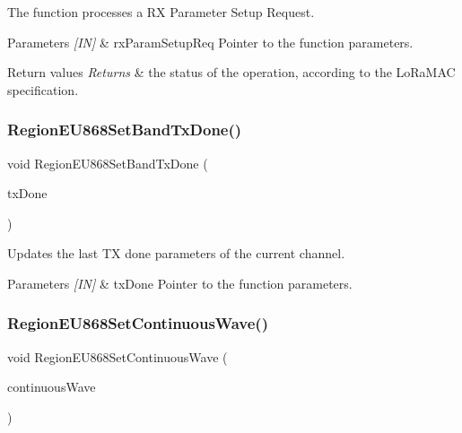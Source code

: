 The function processes a RX Parameter Setup Request. 


\begin{DoxyParams}{Parameters}
{\em \mbox{[}\+I\+N\mbox{]}} & rx\+Param\+Setup\+Req Pointer to the function parameters.\\
\hline
\end{DoxyParams}

\begin{DoxyRetVals}{Return values}
{\em Returns} & the status of the operation, according to the Lo\+Ra\+M\+AC specification. \\
\hline
\end{DoxyRetVals}
\mbox{\label{group__REGIONEU868_ga5cf25bd6be48790f3f637d60a236fdb1}} 
\subsubsection{\texorpdfstring{Region\+E\+U868\+Set\+Band\+Tx\+Done()}{RegionEU868SetBandTxDone()}}
{\footnotesize\ttfamily void Region\+E\+U868\+Set\+Band\+Tx\+Done (\begin{DoxyParamCaption}\item[{\hyperlink{group__REGION_gad0524aa0673c0814a71e7a4f9cade3fc}{Set\+Band\+Tx\+Done\+Params\+\_\+t} $\ast$}]{tx\+Done }\end{DoxyParamCaption})}



Updates the last TX done parameters of the current channel. 


\begin{DoxyParams}{Parameters}
{\em \mbox{[}\+I\+N\mbox{]}} & tx\+Done Pointer to the function parameters. \\
\hline
\end{DoxyParams}
\mbox{\label{group__REGIONEU868_gaa7573d0677552b321af04417a58672eb}} 
\subsubsection{\texorpdfstring{Region\+E\+U868\+Set\+Continuous\+Wave()}{RegionEU868SetContinuousWave()}}
{\footnotesize\ttfamily void Region\+E\+U868\+Set\+Continuous\+Wave (\begin{DoxyParamCaption}\item[{\hyperlink{group__REGION_gaf39bb5ba06921139c6d17f88a8d518cd}{Continuous\+Wave\+Params\+\_\+t} $\ast$}]{continuous\+Wave }\end{DoxyParamCaption})}



